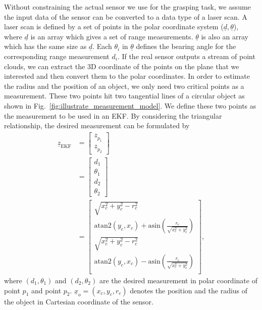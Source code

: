 Without constraining the actual sensor we use for the grasping task, we assume the input data of the sensor can be converted to a data type of a laser scan. A laser scan is defined by a set of points in the polar coordinate system ($\underline{d}, \underline{\theta}$), where $\underline{d}$ is an array which gives a set of range measurements. $\underline{\theta}$ is also an array which has the same size as $\underline{d}$. Each $\theta_i$ in $\underline{\theta}$ defines the bearing angle for the corresponding range measurement  ${d_i}$. If the real sensor outputs a stream of point clouds, we can extract the 3D coordinate of the points on the plane that we interested and then convert them to the polar coordinates. In order to estimate the radius and the position of an object, we only need two critical points as a measurement. These two points hit two tangential lines of a circular object as shown in Fig.~\ref{fig:illustrate_measurement_model}. We define these two points as the measurement to be used in an EKF. By considering the triangular relationship, the desired measurement can be formulated by 
\begin{align}
\underline{z}_{\text{EKF}} &= \begin{bmatrix}
\underline{z}_{p_1}
\\ 
\underline{z}_{p_2}
\end{bmatrix} \\
&= \begin{bmatrix}
d_1 \\
\theta_1 \\
d_2 \\
\theta_2  
\end{bmatrix} \\
&= \begin{bmatrix}
 \sqrt{x^2_c +y^2_c -r^2_c} \\
  \text{atan2}(y_c,x_c) + \text{asin} ( \frac{r_c}{\sqrt{x^2_c +y^2_c} } ) \\
 \sqrt{x^2_c +y^2_c -r^2_c} \\
  \text{atan2}(y_c,x_c) - \text{asin} ( \frac{r_c}{\sqrt{x^2_c +y^2_c} } ) \\
\end{bmatrix},
\end{align}
where $(d_1, \theta_1)$ and $(d_2, \theta_2)$ are the desired measurement in polar coordinate of point $p_1$ and point $p_2$. $\underline{x}_o = (x_c , y_c ,r_c)$ denotes the position and the radius of the object in Cartesian coordinate of the sensor.

